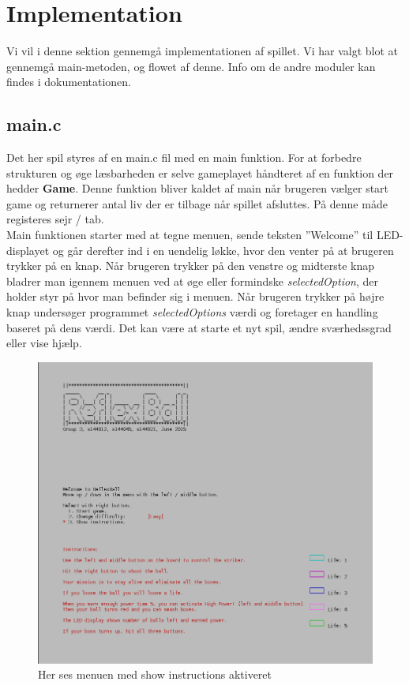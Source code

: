 \section{Implementation}
Vi vil i denne sektion gennemgå implementationen af spillet. Vi har valgt blot at gennemgå main-metoden, og flowet af denne. Info om de andre moduler kan findes i dokumentationen.
\subsection{main.c}
Det her spil styres af en main.c fil med en main funktion. For at forbedre strukturen og øge læsbarheden er selve gameplayet håndteret af en funktion der hedder \textbf{Game}. Denne funktion bliver kaldet af main når brugeren vælger start game og returnerer antal liv der er tilbage når spillet afsluttes. På denne måde registeres sejr /  tab. \\
Main funktionen starter med at tegne menuen, sende teksten ”Welcome” til LED-displayet og går derefter ind i en uendelig løkke, hvor den venter på at brugeren trykker  på en knap. Når brugeren trykker på den venstre  og  midterste knap bladrer man igennem menuen ved at øge eller formindske \textit{selectedOption}, der holder styr på hvor man befinder sig i menuen. Når brugeren trykker på højre knap undersøger programmet \textit{selectedOptions} værdi og foretager en handling baseret på dens værdi. Det kan være at starte et nyt spil, ændre sværhedssgrad eller vise hjælp.\\
\begin{figure}[h]
\begin{center}
\includegraphics[scale=0.6]{img/Menu.png}
\caption{Her ses menuen med show instructions aktiveret}
\end{center}
\end{figure}
